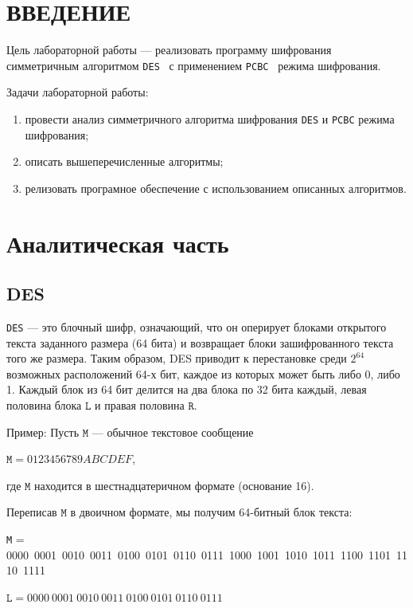 \section*{\large{ВВЕДЕНИЕ}}

Цель лабораторной работы --- реализовать программу шифрования симметричным алгоритмом \texttt{DES}~\cite{des} с применением \texttt{PCBC}~\cite{pcbc} режима шифрования.

Задачи лабораторной работы:

\begin{enumerate}
    \item провести анализ симметричного алгоритма шифрования \texttt{DES} и \texttt{PCBC} режима шифрования;
    \item описать вышеперечисленные алгоритмы;
    \item релизовать програмное обеспечение с использованием описанных алгоритмов.
\end{enumerate}

\clearpage
\section{Аналитическая часть}

\subsection{DES}

\texttt{DES} --- это блочный шифр, означающий, что он оперирует блоками открытого текста заданного размера (64 бита) и возвращает блоки зашифрованного текста того же размера. 
Таким образом, DES приводит к перестановке среди $2^{64}$ возможных расположений 64-х бит, каждое из которых может быть либо 0, либо 1. 
Каждый блок из 64 бит делится на два блока по 32 бита каждый, левая половина блока $\texttt{L}$ и правая половина $\texttt{R}$.

Пример: Пусть $\texttt{M}$ --- обычное текстовое сообщение 

$\texttt{M} = 0123456789ABCDEF$, 

где $\texttt{M}$ находится в шестнадцатеричном формате (основание 16). 

Переписав $\texttt{M}$ в двоичном формате, мы получим 64-битный блок текста:

\texttt{M} = 0000\ 0001\ 0010\ 0011\ 0100\ 0101\ 0110\ 0111\
         1000\ 1001\ 1010\ 1011\ 1100\ 1101\ 1110\ 1111

$\texttt{L} = 0000\ 0001\ 0010\ 0011\ 0100\ 0101\ 0110\ 0111$

